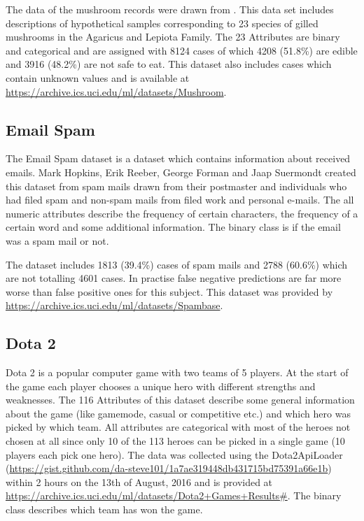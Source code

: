 \documentclass[a4paper,preprint]{sig-alternate-xt}
\begin{document}
The data of the mushroom records were drawn from \cite{mushroom}.
This data set includes descriptions of hypothetical samples corresponding to 23 species of gilled mushrooms in the Agaricus and Lepiota Family.
The 23 Attributes are binary and categorical and are assigned with 8124 cases of which 4208 (51.8\%) are edible and 3916 (48.2\%) are not safe to eat. This dataset also includes cases which contain unknown values and is available at \url{https://archive.ics.uci.edu/ml/datasets/Mushroom}.

\subsection{Email Spam}
The Email Spam dataset is a dataset which contains information about received emails. Mark Hopkins, Erik Reeber, George Forman and Jaap Suermondt created this dataset from spam mails drawn from their postmaster and individuals who had filed spam and non-spam mails from filed work and personal e-mails. The all numeric attributes describe the frequency of certain characters, the frequency of a certain word and some additional information. The binary class is if the email was a spam mail or not.

The dataset includes 1813 (39.4\%) cases of spam mails and 2788 (60.6\%) which are not totalling 4601 cases.
In practise false negative predictions are far more worse than false positive ones for this subject.
This dataset was provided by \url{https://archive.ics.uci.edu/ml/datasets/Spambase}.


\subsection{Dota 2}
Dota 2 is a popular computer game with two teams of 5 players. At the start of the game each player chooses a unique hero with different strengths and weaknesses. The 116 Attributes of this dataset describe some general information about the game (like gamemode, casual or competitive etc.) and which hero was picked by which team. All attributes are categorical with most of the heroes not chosen at all since only 10 of the 113 heroes can be picked in a single game (10 players each pick one hero). The data was collected using the Dota2ApiLoader (\url{https://gist.github.com/da-steve101/1a7ae319448db431715bd75391a66e1b}) within 2 hours on the 13th of August, 2016 and is provided at \url{https://archive.ics.uci.edu/ml/datasets/Dota2+Games+Results#}.
The binary class describes which team has won the game.
\end{document}
